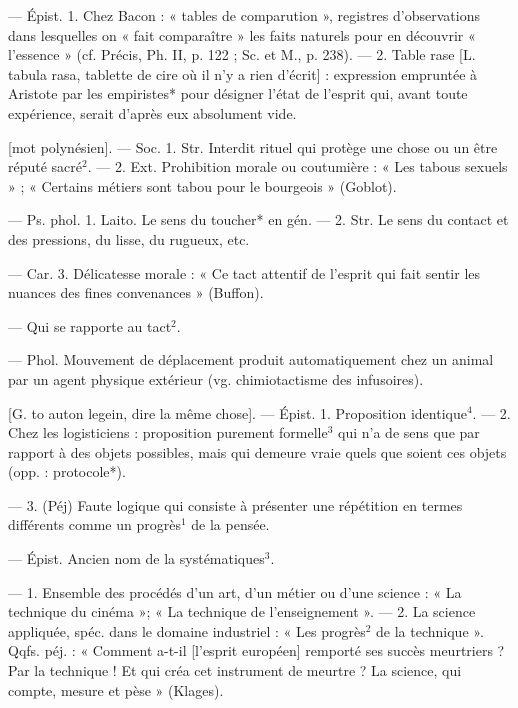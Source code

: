 	\begin{itemize}[leftmargin=1cm, label=, itemsep=1pt]
 — Épist. 1. Chez Bacon : « tables
de comparution », registres d’observations dans lesquelles on « fait
comparaître » les faits naturels pour
en découvrir « l'essence » (cf. Précis,
Ph. II, p. 122 ; Sc. et M., p. 238). —
2. Table rase [L. tabula rasa, tablette de cire où il n’y a rien d’écrit] :
expression empruntée à Aristote
par les empiristes* pour désigner
l’état de l'esprit qui, avant toute
expérience, serait d’après eux absolument vide.

 [mot polynésien]. — Soc.
1. Str. Interdit rituel qui protège
une chose ou un être réputé sacré$^2$.
— 2. Ext. Prohibition morale ou coutumière : « Les tabous sexuels » ;
« Certains métiers sont tabou pour
le bourgeois » (Goblot).

 — Ps. phol. 1. Laito. Le sens du
toucher* en gén. — 2. Str. Le sens
du contact et des pressions, du lisse,
du rugueux, etc.

— Car. 3. Délicatesse morale :
« Ce tact attentif de l'esprit qui fait
sentir les nuances des fines convenances » (Buffon).

 — Qui se rapporte au tact$^2$.

 — Phol. Mouvement de
déplacement produit automatiquement chez un animal par un agent
physique extérieur (vg. chimiotactisme des infusoires).

 [G. to auton legein, dire la
même chose]. — Épist. 1. Proposition identique$^4$. — 2. Chez les logisticiens : proposition purement formelle$^3$ qui n’a de sens que par rapport
à des objets possibles, mais qui demeure vraie quels que soient ces
objets (opp. : protocole*).

— 3. (Péj) Faute logique qui
consiste à présenter une répétition
en termes différents comme un progrès$^1$ de la pensée.

 — Épist.
Ancien nom de la systématiques$^3$.

 — 1. Ensemble des
procédés d’un art, d’un métier ou
d’une science : « La technique du
cinéma »; « La technique de l'enseignement ». — 2. La science appliquée, spéc. dans le domaine industriel : « Les progrès$^2$ de la technique ». Qqfs. péj. : « Comment a-t-il
[l'esprit européen] remporté ses
succès meurtriers ? Par la technique !
Et qui créa cet instrument de
meurtre ? La science, qui compte,
mesure et pèse » (Klages).


\end{itemize}
